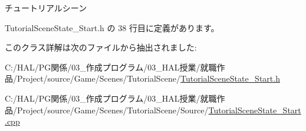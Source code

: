 チュートリアルシーン 



 Tutorial\+Scene\+State\+\_\+\+Start.\+h の 38 行目に定義があります。



このクラス詳解は次のファイルから抽出されました\+:\begin{DoxyCompactItemize}
\item 
C\+:/\+H\+A\+L/\+P\+G関係/03\+\_\+作成プログラム/03\+\_\+\+H\+A\+L授業/就職作品/\+Project/source/\+Game/\+Scenes/\+Tutorial\+Scene/\mbox{\hyperlink{_tutorial_scene_state___start_8h}{Tutorial\+Scene\+State\+\_\+\+Start.\+h}}\item 
C\+:/\+H\+A\+L/\+P\+G関係/03\+\_\+作成プログラム/03\+\_\+\+H\+A\+L授業/就職作品/\+Project/source/\+Game/\+Scenes/\+Tutorial\+Scene/\+Source/\mbox{\hyperlink{_tutorial_scene_state___start_8cpp}{Tutorial\+Scene\+State\+\_\+\+Start.\+cpp}}\end{DoxyCompactItemize}
